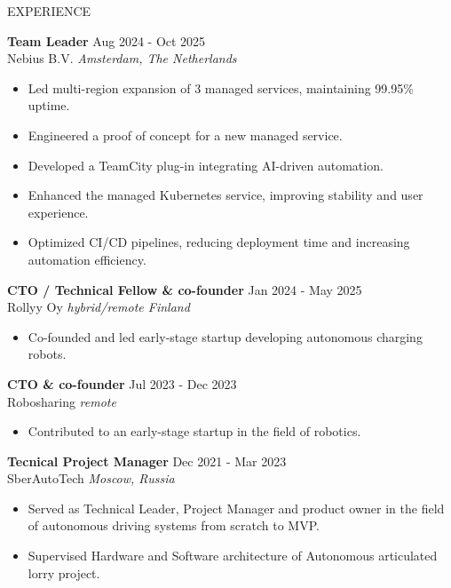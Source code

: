 \documentclass{resume} %
\begin{document}
\begin{rSection}{EXPERIENCE}

\textbf{Team Leader} \hfill Aug 2024 - Oct 2025\\
Nebius B.V. \hfill \textit{Amsterdam, The Netherlands}
\begin{itemize}
	\itemsep -3pt {}
	\item Led multi-region expansion of 3 managed services, maintaining 99.95\% uptime.
	\item Engineered a proof of concept for a new managed service.
	\item Developed a TeamCity plug-in integrating AI-driven automation.
	\item Enhanced the managed Kubernetes service, improving stability and user experience.
	\item Optimized CI/CD pipelines, reducing deployment time and increasing automation efficiency.
\end{itemize}

\textbf{CTO / Technical Fellow \& co-founder} \hfill Jan 2024 - May 2025\\
Rollyy Oy \hfill \textit{hybrid/remote Finland}
\begin{itemize}
	\item Co-founded and led early-stage startup developing autonomous charging robots.
\end{itemize}

\textbf{CTO \& co-founder} \hfill Jul 2023 - Dec 2023\\
Robosharing \hfill \textit{remote}
\begin{itemize}
	\item Contributed to an early-stage startup in the field of robotics.
\end{itemize}

\textbf{Tecnical Project Manager} \hfill Dec 2021 - Mar 2023\\
SberAutoTech \hfill \textit{Moscow, Russia}
\begin{itemize}
   \itemsep -3pt {}
   \item Served as Technical Leader, Project Manager and product owner in the field of autonomous driving systems from scratch to MVP.
   \item Supervised Hardware and Software architecture of Autonomous articulated lorry project.


\end{itemize}
\end{rSection}
\end{document}
